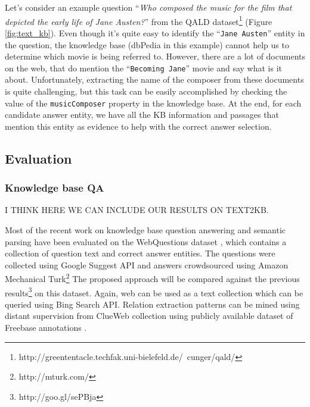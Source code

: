 Let's consider an example question ``\textit{Who composed the music for the film that depicted the early life of Jane Austen?}'' from the QALD dataset\footnote{http://greententacle.techfak.uni-bielefeld.de/~cunger/qald/} (Figure \ref{fig:text_kb}).
Even though it's quite easy to identify the ``\texttt{Jane Austen}'' entity in the question, the knowledge base (dbPedia in this example) cannot help us to determine which movie is being referred to.
However, there are a lot of documents on the web, that do mention the ``\texttt{Becoming Jane}'' movie and say what is it about.
Unfortunately, extracting the name of the composer from these documents is quite challenging, but this task can be easily accomplished by checking the value of the \texttt{musicComposer} property in the knowledge base.
At the end, for each candidate answer entity, we have all the KB information and passages that mention this entity as evidence to help with the correct answer selection.

\subsection{Evaluation}
\label{sec:factoid_evaluation}

\subsubsection{Knowledge base QA}

I THINK HERE WE CAN INCLUDE OUR RESULTS ON TEXT2KB.

Most of the recent work on knowledge base question answering and semantic parsing have been evaluated on the WebQuestions dataset \cite{BerantCFL13:sempre}, which contains a collection of question text and correct answer entities.
The questions were collected using Google Suggest API and answers crowdsourced using Amazon Mechanical Turk\footnote{http://mturk.com/}
The proposed approach will be compared against the previous results\footnote{http://goo.gl/sePBja} on this dataset.
Again, web can be used as a text collection which can be queried using Bing Search API.
Relation extraction patterns can be mined using distant supervision from ClueWeb collection using publicly available dataset of Freebase annotations \cite{gabrilovich2013facc1}.

